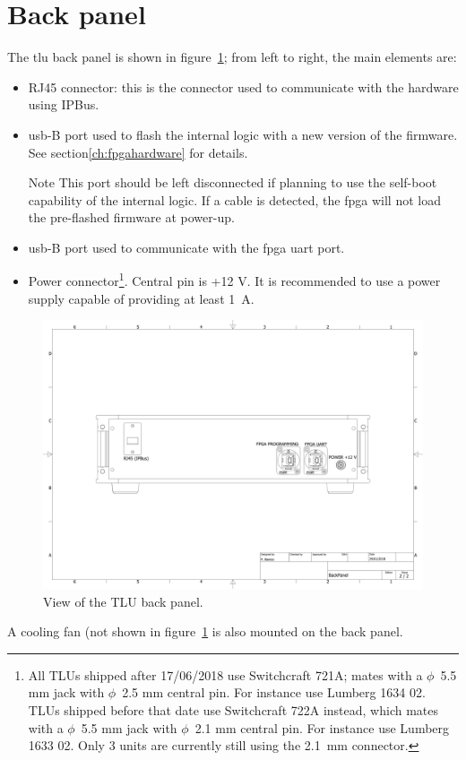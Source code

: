 \section{Back panel}\label{ch:backpanelintro}
The \gls{tlu} back panel is shown in figure~\ref{fig:backpanel}; from left to right, the main elements are:
\begin{itemize}
  \item RJ45 connector: this is the connector used to communicate with the hardware using IPBus.
  \item \gls{usb}-B port used to flash the internal logic with a new version of the firmware. See section\ref{ch:fpgahardware} for details.
  \begin{alertinfo}{Note}
    This port should be left disconnected if planning to use the self-boot capability of the internal logic. If a cable is detected, the \gls{fpga} will not load the pre-flashed firmware at power-up.
  \end{alertinfo}
  \item \gls{usb}-B port used to communicate with the \gls{fpga} \gls{uart} port.
  \item Power connector\footnote{All TLUs shipped after 17/06/2018 use Switchcraft 721A; mates with a $\phi$~5.5 mm jack with $\phi$~2.5 mm central pin. For instance use Lumberg 1634 02.\\ TLUs shipped before that date use Switchcraft 722A instead, which mates with a $\phi$~5.5 mm jack with $\phi$~2.1 mm central pin. For instance use Lumberg 1633 02. Only 3 units are currently still using the 2.1~mm connector.}. Central pin is +12 V. It is recommended to use a power supply capable of providing at least 1~A.
\end{itemize}
\begin{figure}
  \centering
  \includegraphics[width=.950\textwidth]{./Images/backPaneldoc.pdf}
  \caption{View of the TLU back panel.}
  \label{fig:backpanel}
\end{figure}
A cooling fan (not shown in figure~\ref{fig:backpanel} is also mounted on the back panel.

